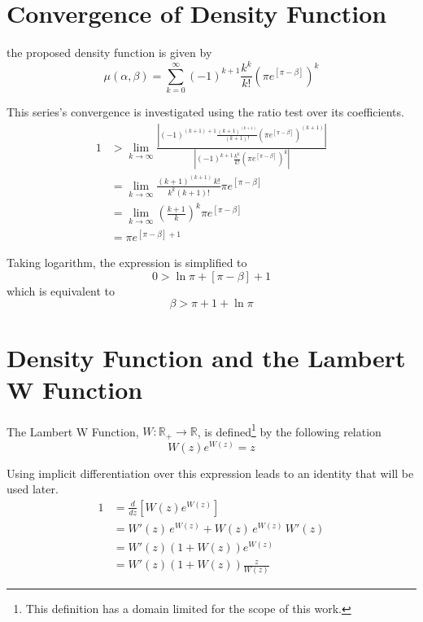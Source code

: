 \documentclass{article}
\newcommand{\R}{\mathbb{R}}
\newcommand{\aabs}[1]{\left| #1 \right|}
\newcommand{\ppar}[1]{\left( #1 \right)}
\newcommand{\spar}[1]{\left[ #1 \right]}
\begin{document}
\section{Convergence of Density Function}
\label{ap:convergence}

the proposed density function is given by
\begin{equation}
    \mu(\alpha, \beta) =
    \sum_{k=0}^{\infty}
    (-1)^{k+1} \frac{k^k}{k!} 
    \ppar{\pi
    e^{\spar{\pi-\beta}} }^k
\end{equation}

This series's convergence is investigated using the ratio test over its coefficients.
\begin{align*}
    1 &>
    \lim_{k\rightarrow \infty}
    \frac{\aabs{
    (-1)^{\ppar{k+1}+1} \frac{\ppar{k+1}^{\ppar{k+1}}}{\ppar{k+1}!} 
    \ppar{\pi
    e^{\spar{\pi-\beta}} }^{\ppar{k+1}}
    }}{\aabs{
    (-1)^{k+1} \frac{k^k}{k!} 
    \ppar{\pi
    e^{\spar{\pi-\beta}} }^k
    }}
    \\
    &=
    \lim_{k\rightarrow \infty}
    {
    \frac{\ppar{k+1}^{\ppar{k+1}}\, k! }{{k}^{k} \ppar{k+1}!}
    {\pi e^{\spar{\pi-\beta}} }
    }
    \\
    &=
    \lim_{k\rightarrow \infty}
    \ppar{\frac{k+1}{k}}^k {\pi e^{\spar{\pi-\beta}} }
    \\
    &=
    {\pi e^{\spar{\pi-\beta}+1} }
\end{align*}

Taking logarithm, the expression is simplified to
\begin{equation}
    0 > \ln{\pi} + \spar{\pi-\beta}+1
\end{equation}
which is equivalent to
\begin{equation}
    \beta > \pi + 1 + \ln{\pi}
\end{equation}

\section{Density Function and the Lambert W Function}
\label{ap:identities}

The Lambert W Function, $W: \R_+\rightarrow \R$, is defined\footnote{This definition has a domain limited for the scope of this work.} by the following relation
\begin{equation}
    W(z) e^{W(z)} = z
\end{equation}

Using implicit differentiation over this expression leads to an identity that will be used later.
\begin{align*}
    1 &=
    \frac{d}{d z} \spar{W(z) e^{W(z)}}
    \\ &=
    W'(z)\, e^{W(z)} + W(z)\, e^{W(z)}\, W'(z)
    \\ &=
    W'(z) \ppar{1+W\ppar{z}} e^{W(z)}
    \\ &=
    W'(z) \ppar{1+W\ppar{z}} \frac{z}{W(z)}
\end{align*}
\end{document}
